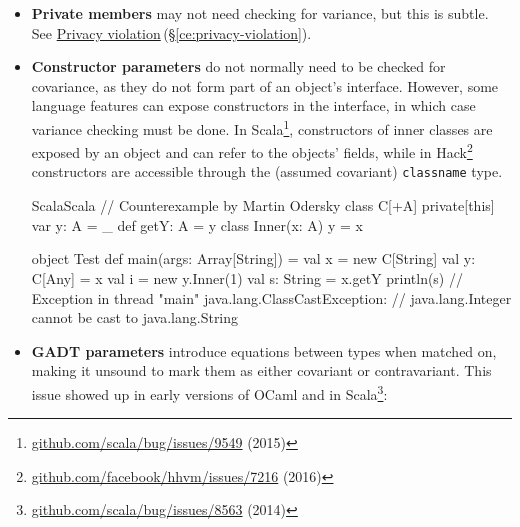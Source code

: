 \documentclass[11pt,oneside]{article}
\newenvironment{ceitemize}{\begin{itemize}}{\end{itemize}}
\newcommand{\code}[1]{\texttt{#1}}
\newcommand{\entryref}[2]{\hyperref[#1]{#2}\,\textcolor{stone}{(\S\ref*{#1})}}
\newenvironment{codegroup}
  {\par\addvspace{\medskipamount}%
   \tcbset{cebox/.append style={before skip=7pt, after skip=7pt}}}
  {\par\addvspace{\medskipamount}}
\begin{document}
\begin{ceitemize}
\item \textbf{Private members} may not need checking for variance, but this is subtle. See \entryref{ce:privacy-violation}{Privacy violation}.
\item \textbf{Constructor parameters} do not normally need to be checked for covariance, as they do not form part of an object's interface. However, some language features can expose constructors in the interface, in which case variance checking must be done. In Scala\footnote{\href{https://github.com/scala/bug/issues/9549}{github.com/\allowbreak{}scala/\allowbreak{}bug/\allowbreak{}issues/\allowbreak{}9549} (2015)}, constructors of inner classes are exposed by an object and can refer to the objects' fields, while in Hack\footnote{\href{https://github.com/facebook/hhvm/issues/7216}{github.com/\allowbreak{}facebook/\allowbreak{}hhvm/\allowbreak{}issues/\allowbreak{}7216} (2016)} constructors are accessible through the (assumed covariant) \code{classname} type.

\begin{codegroup}
\begin{codebox}{Scala}{Scala}
// Counterexample by Martin Odersky
class C[+A] {
  private[this] var y: A = _
  def getY: A = y
  class Inner(x: A) {
    y = x
  }
}

object Test {
  def main(args: Array[String]) = {
    val x = new C[String]
    val y: C[Any] = x
    val i = new y.Inner(1)
    val s: String = x.getY
    println(s)
    // Exception in thread "main" java.lang.ClassCastException:
    // java.lang.Integer cannot be cast to java.lang.String
  }
}
\end{codebox}
\end{codegroup}
\item \textbf{GADT parameters} introduce equations between types when matched on, making it unsound to mark them as either covariant or contravariant. This issue showed up in early versions of OCaml and in Scala\footnote{\href{https://github.com/scala/bug/issues/8563}{github.com/\allowbreak{}scala/\allowbreak{}bug/\allowbreak{}issues/\allowbreak{}8563} (2014)}:


\end{ceitemize}
\end{document}
